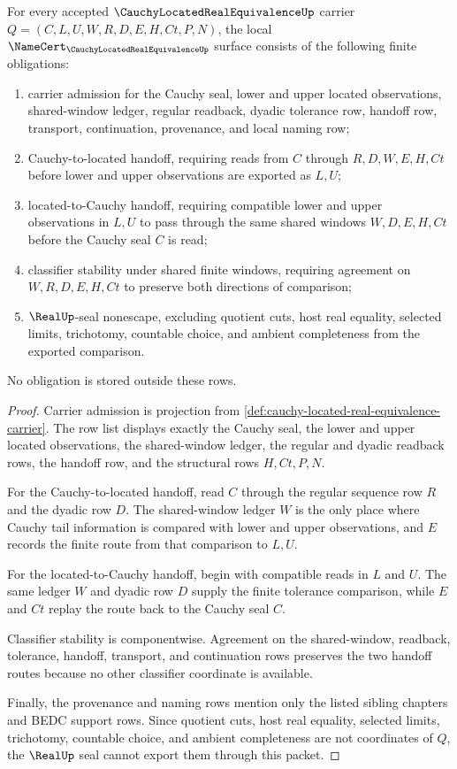 \begin{theorem}
\label{thm:cauchy-located-real-equivalence-namecert-obligations}
For every accepted $\CauchyLocatedRealEquivalenceUp$ carrier $Q=(C,L,U,W,R,D,E,H,Ct,P,N)$, the local $\NameCert_{\CauchyLocatedRealEquivalenceUp}$ surface consists of the following finite obligations:
\begin{enumerate}
\item carrier admission for the Cauchy seal, lower and upper located observations, shared-window ledger, regular readback, dyadic tolerance row, handoff row, transport, continuation, provenance, and local naming row;
\item Cauchy-to-located handoff, requiring reads from $C$ through $R,D,W,E,H,Ct$ before lower and upper observations are exported as $L,U$;
\item located-to-Cauchy handoff, requiring compatible lower and upper observations in $L,U$ to pass through the same shared windows $W,D,E,H,Ct$ before the Cauchy seal $C$ is read;
\item classifier stability under shared finite windows, requiring agreement on $W,R,D,E,H,Ct$ to preserve both directions of comparison;
\item $\RealUp$-seal nonescape, excluding quotient cuts, host real equality, selected limits, trichotomy, countable choice, and ambient completeness from the exported comparison.
\end{enumerate}
No obligation is stored outside these rows.
\end{theorem}
\begin{proof}
Carrier admission is projection from \autoref{def:cauchy-located-real-equivalence-carrier}. The row list displays exactly the Cauchy seal, the lower and upper located observations, the shared-window ledger, the regular and dyadic readback rows, the handoff row, and the structural rows $H,Ct,P,N$.

For the Cauchy-to-located handoff, read $C$ through the regular sequence row $R$ and the dyadic row $D$. The shared-window ledger $W$ is the only place where Cauchy tail information is compared with lower and upper observations, and $E$ records the finite route from that comparison to $L,U$.

For the located-to-Cauchy handoff, begin with compatible reads in $L$ and $U$. The same ledger $W$ and dyadic row $D$ supply the finite tolerance comparison, while $E$ and $Ct$ replay the route back to the Cauchy seal $C$.

Classifier stability is componentwise. Agreement on the shared-window, readback, tolerance, handoff, transport, and continuation rows preserves the two handoff routes because no other classifier coordinate is available.

Finally, the provenance and naming rows mention only the listed sibling chapters and BEDC support rows. Since quotient cuts, host real equality, selected limits, trichotomy, countable choice, and ambient completeness are not coordinates of $Q$, the $\RealUp$ seal cannot export them through this packet.
\end{proof}

